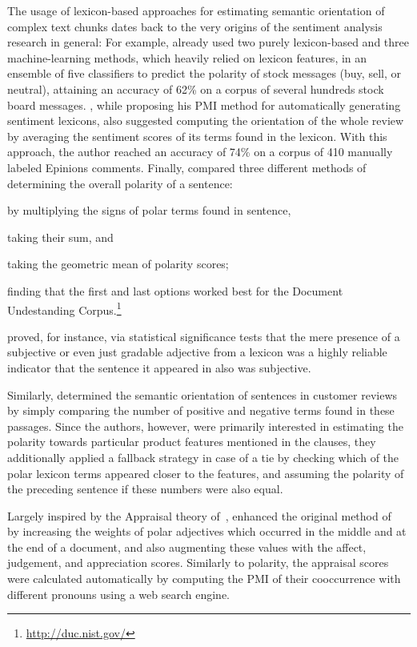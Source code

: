 The usage of lexicon-based approaches for estimating semantic
orientation of complex text chunks dates back to the very origins of
the sentiment analysis research in general: For example,
\citet{Das:01} already used two purely lexicon-based and three
machine-learning methods, which heavily relied on lexicon features, in
an ensemble of five classifiers to predict the polarity of stock
messages (buy, sell, or neutral), attaining an accuracy of 62\% on a
corpus of several hundreds stock board messages.  \citet{Turney:02},
while proposing his PMI method for automatically generating sentiment
lexicons, also suggested computing the orientation of the whole review
by averaging the sentiment scores of its terms found in the lexicon.
With this approach, the author reached an accuracy of 74\% on a corpus
of 410 manually labeled Epinions comments.  Finally, \citet{Kim:04}
compared three different methods of determining the overall polarity
of a sentence:
\begin{inparaenum}[(i)]
  \item by multiplying the signs of polar terms found in sentence,
  \item taking their sum, and
  \item taking the geometric mean of polarity scores;
\end{inparaenum}
finding that the first and last options worked best for the Document
Undestanding Corpus.\footnote{\url{http://duc.nist.gov/}}

\citet{Hatzivassi:00} proved, for instance, via statistical
significance tests that the mere presence of a subjective or even just
gradable adjective from a lexicon was a highly reliable indicator that
the sentence it appeared in also was subjective.

Similarly, \citet{Hu:04} determined the semantic orientation of
sentences in customer reviews by simply comparing the number of
positive and negative terms found in these passages. Since the
authors, however, were primarily interested in estimating the polarity
towards particular product features mentioned in the clauses, they
additionally applied a fallback strategy in case of a tie by checking
which of the polar lexicon terms appeared closer to the features, and
assuming the polarity of the preceding sentence if these numbers were
also equal.

Largely inspired by the Appraisal theory of~\citet{Martin:00},
\citet{Taboada:04} enhanced the original method of~\citet{Turney:02}
by increasing the weights of polar adjectives which occurred in the
middle and at the end of a document, and also augmenting these values
with the affect, judgement, and appreciation scores.  Similarly to
polarity, the appraisal scores were calculated automatically by
computing the PMI of their cooccurrence with different pronouns using
a web search engine.

